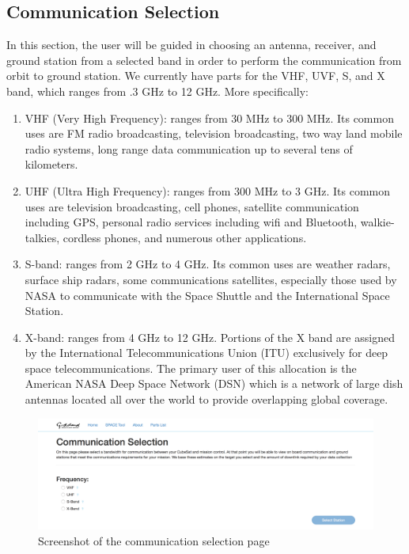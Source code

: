 \documentclass[a4, 12 pt]{article} %
\begin{document}
\subsection{Communication Selection}
In this section, the user will be guided in choosing an antenna, receiver, and ground station from a selected band in order to perform the communication from orbit to ground station. We currently have parts for the VHF, UVF, S, and X band, which ranges from .3 GHz to 12 GHz. More specifically:
\begin{enumerate}
\item VHF (Very High Frequency): ranges from 30 MHz to 300 MHz. Its common uses are FM radio broadcasting, television broadcasting, two way land mobile radio systems, long range data communication up to several tens of kilometers.
\item UHF (Ultra High Frequency): ranges from 300 MHz to 3 GHz. Its common uses are television broadcasting, cell phones, satellite communication including GPS, personal radio services including wifi and Bluetooth, walkie-talkies, cordless phones, and numerous other applications.
\item S-band: ranges from 2 GHz to 4 GHz. Its common uses are weather radars, surface ship radars, some communications satellites, especially those used by NASA to communicate with the Space Shuttle and the International Space Station.
\item X-band: ranges from 4 GHz to 12 GHz. Portions of the X band are assigned by the International Telecommunications Union (ITU) exclusively for deep space telecommunications. The primary user of this allocation is the American NASA Deep Space Network (DSN) which is a network of large dish antennas located all over the world to provide overlapping global coverage.
\end{enumerate}
\begin{figure}[H]
\begin{center}
\includegraphics[width=\linewidth]{5}
\caption{Screenshot of the communication selection page}
\label{default}
\end{center}
\end{figure}
\end{document}
